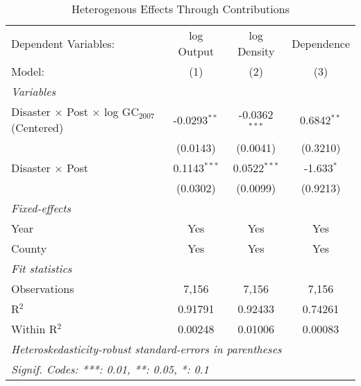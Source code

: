 
\begin{table}[htbp]
   \caption{Heterogenous Effects Through Contributions}
   \centering
   \begin{adjustbox}{max width = \textwidth, center}
      \begin{tabular}{lccc}
         \tabularnewline \midrule \midrule
         Dependent Variables:                                         & log Output     & log Density     & Dependence\\  
         Model:                                                       & (1)            & (2)             & (3)\\  
         \midrule
         \emph{Variables}\\
         Disaster $\times$ Post $\times$ log GC$_{2007}$ (Centered)   & -0.0293$^{**}$ & -0.0362$^{***}$ & 0.6842$^{**}$\\   
                                                                      & (0.0143)       & (0.0041)        & (0.3210)\\   
         Disaster $\times$ Post                                       & 0.1143$^{***}$ & 0.0522$^{***}$  & -1.633$^{*}$\\   
                                                                      & (0.0302)       & (0.0099)        & (0.9213)\\   
         \midrule
         \emph{Fixed-effects}\\
         Year                                                         & Yes            & Yes             & Yes\\  
         County                                                       & Yes            & Yes             & Yes\\  
         \midrule
         \emph{Fit statistics}\\
         Observations                                                 & 7,156          & 7,156           & 7,156\\  
         R$^2$                                                        & 0.91791        & 0.92433         & 0.74261\\  
         Within R$^2$                                                 & 0.00248        & 0.01006         & 0.00083\\  
         \midrule \midrule
         \multicolumn{4}{l}{\emph{Heteroskedasticity-robust standard-errors in parentheses}}\\
         \multicolumn{4}{l}{\emph{Signif. Codes: ***: 0.01, **: 0.05, *: 0.1}}\\
      \end{tabular}
   \end{adjustbox}
\end{table}



